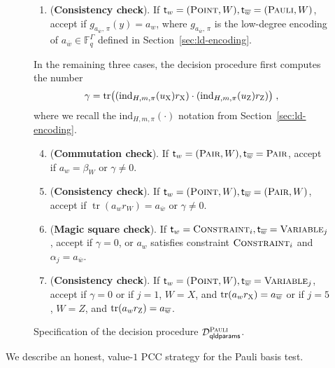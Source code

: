 \documentclass[11pt]{article}
\theoremstyle{definition}
\newcommand{\F}{\ensuremath{\mathbb{F}}}
\newcommand{\ind}{\ensuremath{\textrm{ind}}}
\DeclareMathOperator{\tr}{tr}
\newcommand{\decider}{\mathcal{D}}
\newcommand{\gamestyle}[1]{\ensuremath{\textsc{#1}}\xspace}
\newcommand{\pauli}{\gamestyle{Pauli}}
\newcommand{\labelstyle}[1]{\ensuremath{\textsc{#1}}\xspace}
\newcommand{\xpt}{\labelstyle{X}}
\newcommand{\zpt}{\labelstyle{Z}}
\newcommand{\tvarstyle}[1]{\mathsf{#1}}
\newcommand{\tvar}{\ensuremath{\tvarstyle{t}}}
\newcommand{\typestyle}[1]{\ensuremath{\textsc{#1}}\xspace}
\newcommand{\Point}{\typestyle{Point}}
\newcommand{\Pair}{\typestyle{Pair}}
\newcommand{\Constraint}{\typestyle{Constraint}}
\newcommand{\Variable}{\typestyle{Variable}}
\newcommand{\Pauli}{\typestyle{Pauli}}
\newcommand{\qldparams}{\mathsf{qldparams}}
\newenvironment{gamespec}{
  \begin{mdframed}[style=figstyle]}{
  \end{mdframed}}
\begin{document}
\begin{figure}[htbp!]
\begin{gamespec}
\begin{enumerate}[itemsep=2pt,parsep=2pt]
    \item (\textbf{Consistency check}).
      \label{item:low-degree-consistency}
      If $\tvar_w = (\Point, W), \tvar_{\overline{w}} = (\Pauli, W)$, accept if
      $g_{a_{\overline{w}},\, \pi}(y) = a_w$, where $g_{a_{\overline{w}},\, \pi}$ is
      the low-degree encoding of $a_{\overline{w}} \in \F_q^\Gamma$ defined in
      Section~\ref{sec:ld-encoding}.
    \end{enumerate}
    In the remaining three cases, the decision procedure first computes the number
    \begin{equation}
      \label{eq:gamma-value}
      \gamma = \tr \bigl( (\ind_{H, m,\pi}(u_\xpt) r_\xpt) \cdot
      (\ind_{H,m, \pi}(u_\zpt) r_\zpt) \bigr)\;,
    \end{equation}
    where we recall the $\ind_{H, m, \pi}(\cdot)$ notation from Section~\ref{sec:ld-encoding}.
    \begin{enumerate}[itemsep=2pt,parsep=2pt]
      \setcounter{enumi}{3}
    \item (\textbf{Commutation check}).
      \label{item:commutation} If $\tvar_w = (\Pair, W), \tvar_{\overline{w}} =
      \Pair$, accept if $a_w = \beta_W$ or $\gamma \neq 0$.
    \item (\textbf{Consistency check}).
      \label{item:commutation-consistency} If $\tvar_w = (\Point,W), \tvar_{\overline{w}} =
      (\Pair,W)$, accept if $\tr (a_w r_W) = a_{\overline{w}}$ or $\gamma \neq 0$.
      
    \item (\textbf{Magic square check}).
      \label{item:magic-square} If $\tvar_w = \Constraint_i,
      \tvar_{\overline{w}} = \Variable_j$, accept if $\gamma = 0$, or $a_w$
      satisfies constraint $\Constraint_i$ and $ \alpha_j = a_{\overline{w}}$.

    \item (\textbf{Consistency check}).
      \label{item:magic-square-consistency}
      If $\tvar_w = (\Point,W), \tvar_{\overline{w}} = \Variable_j$, accept if
      $\gamma = 0$ or if $j = 1$, $W = X$, and $\tr(a_w r_\xpt) =
      a_{\overline{w}}$ or if $j = 5$, $W = Z$, and $\tr(a_w r_\zpt) =
      a_{\overline{w}}$.
    \end{enumerate}
  \end{gamespec}
  \caption{Specification of the decision procedure $\decider^\pauli_\qldparams$.}
  \label{fig:decider_pauli}
\end{figure}

We describe an honest, value-$1$ PCC strategy for the Pauli basis test.
\end{document}

